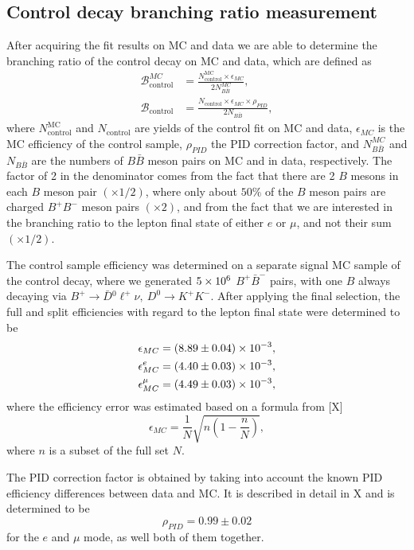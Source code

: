 \subsection{Control decay branching ratio measurement}

After acquiring the fit results on MC and data we are able to determine the branching ratio of the control decay on MC and data, which are defined as
\begin{align}
\mathcal{B}^{MC}_{\mathrm{control}} &= \frac{N^{\mathrm{MC}}_\mathrm{control} \times \epsilon_{MC}}{2N_{B\bar B}^{MC}},\\
\mathcal{B}_{\mathrm{control}} &= \frac{N_\mathrm{control} \times \epsilon_{MC} \times \rho_{PID}}{2N_{B\bar B}},
\label{eq:br_data}
\end{align}
where $N^{\mathrm{MC}}_\mathrm{control}$ and $N_\mathrm{control}$ are yields of the control fit on MC and data, $\epsilon_{MC}$ is the MC efficiency of the control sample, $\rho_{PID}$ the PID correction factor, and $N_{B\bar B}^{MC}$ and $N_{B\bar B}$ are the numbers of $B \bar B$ meson pairs on MC and in data, respectively. The factor of 2 in the denominator comes from the fact that there are 2 $B$ mesons in each $B$ meson pair $(\times 1/2)$, where only about $50\%$ of the $B$ meson pairs are charged $B^+B^-$ meson pairs $(\times 2)$, and from the fact that we are interested in the branching ratio to the lepton final state of either $e$ or $\mu$, and not their sum $(\times 1/2)$.

The control sample efficiency was determined on a separate signal MC sample of the control decay, where we generated $5\times 10^{6}$ $B^+ \bar B^-$ pairs, with one $B$ always decaying via $B^+ \to \bar D {}^0 \ell^+ \nu,~D^0 \to K^+K^-$. After applying the final selection, the full and split efficiencies with regard to the lepton final state were determined to be 
\begin{align*}
\epsilon_{MC} &= (8.89\pm 0.04)\times 10^{-3},\\
\epsilon_{MC}^e &= (4.40\pm 0.03)\times 10^{-3},\\
\epsilon_{MC}^\mu &= (4.49\pm 0.03)\times 10^{-3},
\end{align*}
where the efficiency error was estimated based on a formula from [X]
\begin{equation*}
\epsilon_{MC} = \frac{1}{N}\sqrt{n(1-\frac{n}{N})},
\end{equation*}
where $n$ is a subset of the full set $N$.

The PID correction factor is obtained by taking into account the known PID efficiency differences between data and MC. It is described in detail in X and is determined to be
\begin{equation*}
\rho_{PID} = 0.99\pm 0.02
\end{equation*}
for the $e$ and $\mu$ mode, as well both of them together.

